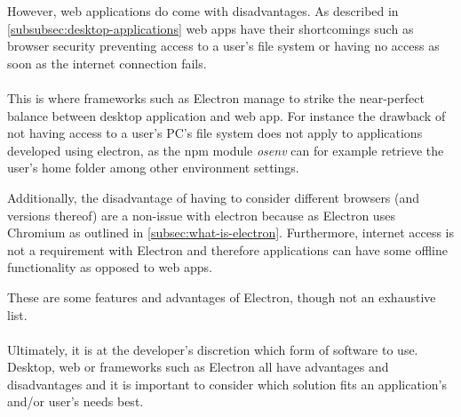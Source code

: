 
However, web applications do come with disadvantages. 
As described in \ref{subsubsec:desktop-applications} web apps have their shortcomings such as 
browser security preventing access to a user's file system or having no access as soon as the internet connection
fails.\paragraph{}
This is where frameworks such as Electron manage to strike the near-perfect balance between desktop application and web app.
For instance the drawback of not having access to a user's PC's file system does not apply to applications 
developed using electron, as the npm module \emph{osenv} can for example retrieve the user's home folder among 
other environment settings. \parencite{osenv}\par
Additionally, the disadvantage of having to consider different browsers (and versions thereof) are a non-issue
with electron because as Electron uses Chromium as outlined in \ref{subsec:what-is-electron}. 
Furthermore, internet access is not a requirement with Electron and therefore applications can have some offline
functionality as opposed to web apps.\par
These are some features and advantages of Electron, though not an exhaustive list. \parencite{electronDocs}\paragraph{}
Ultimately, it is at the developer's discretion which form of software to use. 
Desktop, web or frameworks such as Electron all have advantages and disadvantages and it is important to consider
which solution fits an application's and/or user's needs best.
